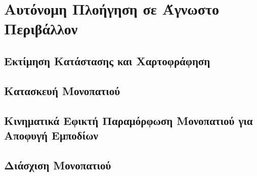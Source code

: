 
\chapter{Αυτόνομη Πλοήγηση σε Άγνωστο Περιβάλλον} %

\label{Chapter3} %

\section{Εκτίμηση Κατάστασης και Χαρτοφράφηση}


\section{Κατασκευή Μονοπατιού}


\section{Κινηματικά Εφικτή Παραμόρφωση Μονοπατιού για Αποφυγή Εμποδίων}


\section{Διάσχιση Μονοπατιού}

